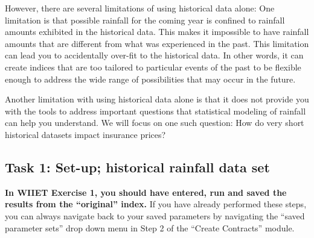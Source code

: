 \documentclass[letterpaper,10pt,english]{sphinxmanual}
\begin{document}
However, there are several limitations of using historical data alone: One limitation is that possible rainfall for the coming year is confined to rainfall amounts exhibited in the historical data. This makes it impossible to have rainfall amounts that are different from what was experienced in the past. This limitation can lead you to accidentally over-fit to the historical data. In other words, it can create indices that are too tailored to particular events of the past to be flexible enough to address the wide range of possibilities that may occur in the future.

Another limitation with using historical data alone is that it does not provide you with the tools to address important questions that statistical modeling of rainfall can help you understand. We will focus on one such question: How do very short historical datasets impact insurance prices?


\subsection{Task 1: Set-up; historical rainfall data set}
\label{wiiet/wiiet_influenceshortdatasets_Web:task-1-set-up-historical-rainfall-data-set}
\textbf{In WIIET Exercise 1, you should have entered, run and saved the results from the ``original'' index.} If you have already performed these steps, you can always navigate back to your saved parameters by navigating the ``saved parameter sets'' drop down menu in Step 2 of the ``Create Contracts'' module.
\end{document}
